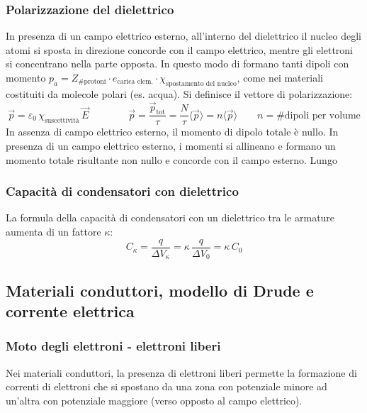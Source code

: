 \documentclass[a4paper]{article}
\begin{document}
\subsubsection*{Polarizzazione del dielettrico}
In presenza di un campo elettrico esterno, all'interno del dielettrico il nucleo degli atomi si sposta in direzione concorde
con il campo elettrico, mentre gli elettroni si concentrano nella parte opposta. In questo modo di formano tanti dipoli con
momento \(p_a = Z_\text{\# protoni} \cdot e_\text{carica elem.} \cdot \chi_\text{spostamento del nucleo}\), come nei materiali
costituiti da molecole polari (es. acqua). Si definisce il vettore di polarizzazione:
\[\vec{p} = \varepsilon_0 \, \chi_\text{suscettività} \, \vec{E} \qquad \qquad \vec{p} = \frac{\vec{p}_\text{tot}}{\tau} = \frac{N}{\tau} \langle \vec{p} \rangle  = n \langle \vec{p} \rangle  \qquad n = \text{\# dipoli per volume}\]
In assenza di campo elettrico esterno, il momento di dipolo totale è nullo. In presenza di un campo elettrico esterno, i momenti
si allineano e formano un momento totale risultante non nullo e concorde con il campo esterno. Lungo 

\subsubsection*{Capacità di condensatori con dielettrico}
La formula della capacità di condensatori con un dielettrico tra le armature aumenta di un fattore \(\kappa\):
\[C_\kappa = \frac{q}{\Delta V_\kappa} = \kappa \, \frac{q}{\Delta V_0} = \kappa \, C_0\]

\subsection{Materiali conduttori, modello di Drude e corrente elettrica}
\subsubsection*{Moto degli elettroni - elettroni liberi}
Nei materiali conduttori, la presenza di elettroni liberi permette la formazione di correnti di elettroni che si spostano da una
zona con potenziale minore ad un'altra con potenziale maggiore (verso opposto al campo elettrico).
\end{document}
